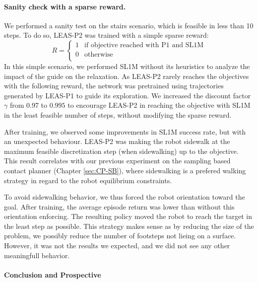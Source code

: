 \paragraph{Sanity check with a sparse reward.}
We performed a sanity test on the stairs scenario, which is feasible in less than 10 steps.
To do so, LEAS-P2 was trained with a simple sparse reward:
\begin{equation}
    R = \left\{
    \begin{array}{ll}
        1 & \mbox{if objective reached with P1 and SL1M}\\
        0 & \mbox{otherwise}\\
    \end{array}
\right.
\end{equation}
In this simple scenario, we performed SL1M without its heuristics to analyze the impact of the guide on the relaxation.
As LEAS-P2 rarely reaches the objectives with the following reward, the network was pretrained using trajectories generated by LEAS-P1 to guide its exploration.
We increased the discount factor $\gamma$ from $0.97$ to $0.995$ to encourage LEAS-P2 in reaching the objective with SL1M in the least feasible number of steps, without modifying the sparse reward.

After training, we observed some improvements in SL1M success rate, but with an unexpected behaviour.
LEAS-P2 was making the robot sidewalk at the maximum feasible discretization step (when sidewalking) up to the objective.
This result correlates with our previous experiment on the sampling based contact planner (Chapter \ref{sec:CP-SB}), where sidewalking is a prefered walking strategy in regard to the robot equilibrium constraints.

To avoid sidewalking behavior, we thus forced the robot orientation toward the goal.
After training, the average episode return was lower than without this orientation enforcing.
The resulting policy moved the robot to reach the target in the least step as possible.
This strategy makes sense as by reducing the size of the problem, we possibly reduce the number of footsteps not lieing on a surface.
However, it was not the results we expected, and we did not see any other meaningfull behavior.

\paragraph{Conclusion and Prospective}

